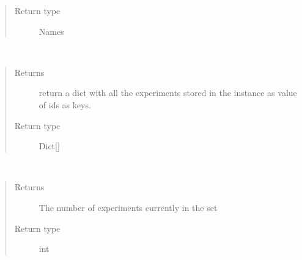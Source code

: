 \documentclass[letterpaper,10pt,english]{sphinxmanual}
\begin{document}
\begin{fulllineitems}
\begin{fulllineitems}
\begin{quote}
\begin{description}
\item[{Return type}] \leavevmode
Names

\end{description}\end{quote}

\end{fulllineitems}


\begin{fulllineitems}
\label{\detokenize{IPTK.Classes:IPTK.Classes.ExperimentalSet.ExperimentSet.get_experiments}}~\begin{quote}\begin{description}
\item[{Returns}] \leavevmode
return a dict with all the experiments stored in the instance as value of ids as keys.

\item[{Return type}] \leavevmode
Dict{[}{\hyperref[\detokenize{IPTK.Classes:IPTK.Classes.Experiment.Experiment}]{}}{]}

\end{description}\end{quote}

\end{fulllineitems}


\begin{fulllineitems}
\label{\detokenize{IPTK.Classes:IPTK.Classes.ExperimentalSet.ExperimentSet.get_num_experiments_in_the_set}}~\begin{quote}\begin{description}
\item[{Returns}] \leavevmode
The number of experiments currently in the set

\item[{Return type}] \leavevmode
int


\end{description}
\end{quote}
\end{fulllineitems}
\end{fulllineitems}
\end{document}
